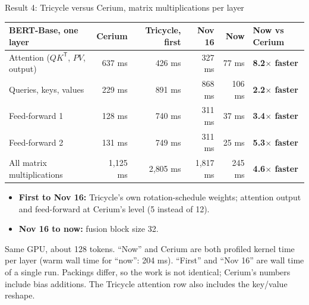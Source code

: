\documentclass[aspectratio=169]{beamer}
\begin{document}
\begin{frame}{Result 4: Tricycle versus Cerium, matrix multiplications per layer}
\small
\begin{center}\footnotesize
\begin{tabular}{@{}lrrrrl@{}}
\toprule
\textbf{BERT-Base, one layer} & \textbf{Cerium} & \textbf{Tricycle, first} & \textbf{Nov 16} & \textbf{Now} & \textbf{Now vs Cerium}\\
\midrule
Attention ($QK^{\mathsf T}$, $PV$, output) & 637 ms & 426 ms & 327 ms & 77 ms & \textbf{8.2$\times$ faster}\\
Queries, keys, values & 229 ms & 891 ms & 868 ms & 106 ms & \textbf{2.2$\times$ faster}\\
Feed-forward 1 & 128 ms & 740 ms & 311 ms & 37 ms & \textbf{3.4$\times$ faster}\\
Feed-forward 2 & 131 ms & 749 ms & 311 ms & 25 ms & \textbf{5.3$\times$ faster}\\
\midrule
All matrix multiplications & 1{,}125 ms & 2{,}805 ms & 1{,}817 ms & 245 ms & \textbf{4.6$\times$ faster}\\
\bottomrule
\end{tabular}
\end{center}
\vspace{0.3em}
\begin{itemize}\small
  \item \textbf{First to Nov 16:} Tricycle's own rotation-schedule weights; attention output and feed-forward at Cerium's level (5 instead of 12).
  \item \textbf{Nov 16 to now:} fusion block size 32.
\end{itemize}
{\footnotesize Same GPU, about 128 tokens. ``Now'' and Cerium are both profiled kernel time per layer (warm wall time for ``now'': 204 ms). ``First'' and ``Nov 16'' are wall time of a single run. Packings differ, so the work is not identical; Cerium's numbers include bias additions. The Tricycle attention row also includes the key/value reshape.}
\end{frame}
\end{document}
